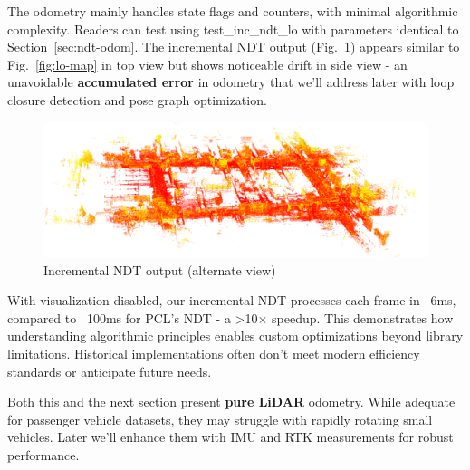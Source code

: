 The odometry mainly handles state flags and counters, with minimal algorithmic complexity. Readers can test using test\_inc\_ndt\_lo with parameters identical to Section~\ref{sec:ndt-odom}. The incremental NDT output (Fig.~\ref{fig:ulhk-odom}) appears similar to Fig.~\ref{fig:lo-map} in top view but shows noticeable drift in side view - an unavoidable \textbf{accumulated error} in odometry that we'll address later with loop closure detection and pose graph optimization.

\begin{figure}[!thp]
	\centering
	\includegraphics[width=1.0\textwidth]{resources/3d-lidar-mapping/ulhk-odom}
	\caption{Incremental NDT output (alternate view)}
	\label{fig:ulhk-odom}
\end{figure}

With visualization disabled, our incremental NDT processes each frame in ~6ms, compared to ~100ms for PCL's NDT - a >10× speedup. This demonstrates how understanding algorithmic principles enables custom optimizations beyond library limitations. Historical implementations often don't meet modern efficiency standards or anticipate future needs.

Both this and the next section present \textbf{pure LiDAR} odometry. While adequate for passenger vehicle datasets, they may struggle with rapidly rotating small vehicles. Later we'll enhance them with IMU and RTK measurements for robust performance.



